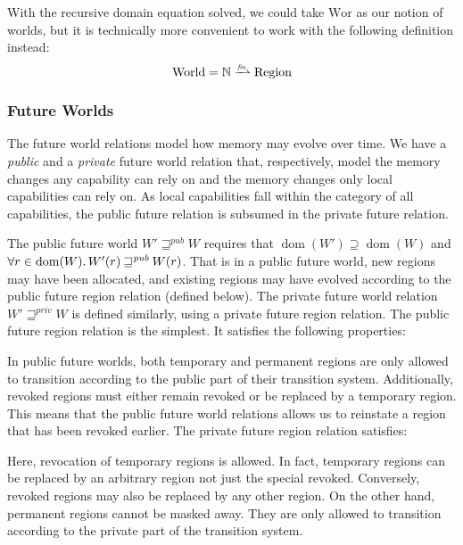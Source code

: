\documentclass[format=acmsmall, review=true, screen=true]{acmart}
\newcommand{\finparfun}{\xrightharpoonup{\textit{\tiny{fin}}}}
\DeclareMathOperator{\dom}{dom}
\newcommand\lau[1]{{\color{purple} \sf \footnotesize {LS: #1}}\\}
\newcommand\dominique[1]{{\color{purple} \sf \footnotesize {DD: #1}}\\}
\renewcommand\lau[1]{}
\renewcommand\dominique[1]{}
\newcommand{\var}[1]{\mathit{#1}}
\newcommand{\pub}{\var{pub}}
\newcommand{\futurewk}{\mathbin{\sqsupseteq}^{\var{pub}}}
\newcommand{\futurestr}{\mathbin{\sqsupseteq}^{\var{priv}}}
\newcommand{\plaindom}[1]{\mathrm{#1}}
\newcommand{\nats}{\mathbb{N}}
\newcommand{\Regions}{\plaindom{Region}}
\newcommand{\Worlds}{\plaindom{World}}
\newcommand{\Wor}{\plaindom{Wor}}
\newcommand{\plainview}[1]{\mathrm{#1}}
\newcommand{\temp}{\plainview{temp}}
\newcommand{\revoked}{\plainview{revoked}}
\begin{document}
With the recursive domain equation solved, we could take $\Wor$ as our notion of
worlds, but it is technically more convenient to work with the following
definition instead:
\[
  \Worlds = \nats \finparfun \Regions
\]

\subsubsection{Future Worlds}
\label{subsec:future-worlds} 
The future world relations model how memory may evolve over time.
We have a \emph{public} and a \emph{private} future world relation that, respectively, model the memory changes any capability can rely on and the memory changes only local capabilities can rely on.
As local capabilities fall within the category of all capabilities, the public future relation is subsumed in the private future relation.

The public future world $W' \futurewk W$ requires that $\dom(W') \supseteq \dom(W)$ and $\forall r \in \dom(W) \ldotp W'(r) \futurewk W(r)$.
That is in a public future world, new regions may have been allocated, and existing regions may have evolved according to the public future region relation (defined below).
The private future world relation $W' \futurestr W$ is defined similarly, using a private future region relation.
The public future region relation is the simplest.
It satisfies
the following properties:
In public future worlds, both temporary and permanent regions are only allowed to transition according to the public part of their transition system.
Additionally, revoked regions must either remain revoked or be replaced by a temporary region.
This means that the public future world relations allows us to reinstate a region that has been revoked earlier.
The private future region relation satisfies:
Here, revocation of temporary regions is allowed.
In fact, temporary regions can be replaced by an arbitrary region not just the special $\revoked$.
Conversely, $\revoked$ regions may also be replaced by any other region.
On the other hand, permanent regions cannot be masked away.
They are only allowed to transition according to the private part of the transition system.
\end{document}
